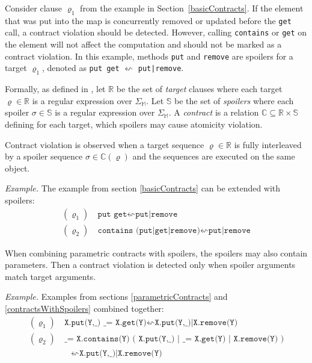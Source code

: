 Consider clause $\varrho_1$ from the example in Section~\ref{basicContracts}. If
the element that was put into the map is concurrently removed or updated before
the \texttt{get} call, a contract violation should be detected.  However,
calling \texttt{contains} or \texttt{get} on the element will not affect the
computation and should not be marked as a contract violation. In this example,
methods \texttt{put} and \texttt{remove} are spoilers for a target
$\varrho_1$, denoted as \texttt{put get} $\leftsquigarrow$ \texttt{put|remove}.


Formally, as defined in \cite{contracts}, let $\mathbb{R}$ be the set of
\emph{target} clauses where each target $\varrho \in \mathbb{R}$ is a regular
expression over $\Sigma_\mathbb{M}$. Let $\mathbb{S}$ be the set of
\emph{spoilers} where each spoiler $\sigma \in \mathbb{S}$ is a regular
expression over $\Sigma_\mathbb{M}$. A \emph{contract} is a relation $\mathbb{C}
\subseteq \mathbb{R} \times \mathbb{S}$ defining for each target, which spoilers
may cause atomicity violation.

Contract violation is observed when a target sequence $\varrho \in \mathbb{R}$
is fully interleaved by a spoiler sequence $\sigma \in \mathbb{C}(\varrho)$ and
the sequences are executed on the same object.

\emph{Example.} The example from section \ref{basicContracts} can be extended
with spoilers:
\begin{align*}
    (\varrho_1) &\ \texttt{put get} \leftsquigarrow \texttt{put|remove}\\
    (\varrho_2) &\ \texttt{contains (put|get|remove)} \leftsquigarrow
    \texttt{put|remove}
\end{align*}

When combining parametric contracts with spoilers, the spoilers may also contain
parameters. Then a contract violation is detected only when spoiler arguments
match target arguments.

\emph{Example.} Examples from sections \ref{parametricContracts} and
\ref{contractsWithSpoilers} combined together:
\begin{align*}
    (\varrho_1) &\ \texttt{X.put(Y,\_) \_ = X.get(Y)} \leftsquigarrow
    \texttt{X.put(Y,\_)|X.remove(Y)}\\
    (\varrho_2) &\ \texttt{\_ = X.contains(Y) ( X.put(Y,\_) | \_ = X.get(Y) |
    X.remove(Y) )}\\
    &\quad \leftsquigarrow \texttt{X.put(Y,\_)|X.remove(Y)}
\end{align*}


